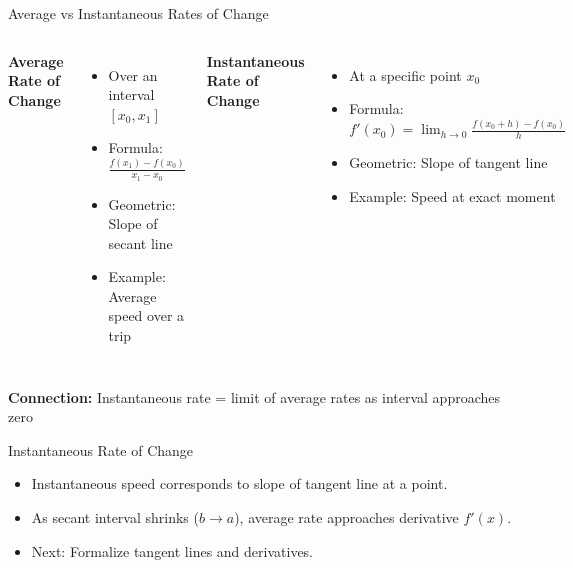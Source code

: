 \documentclass{beamer}
\begin{document}
\begin{frame}{Average vs Instantaneous Rates of Change}
  \begin{columns}
      \textbf{Average Rate of Change}
      \begin{itemize}
        \item Over an interval $[x_0, x_1]$
        \item Formula: $\frac{f(x_1) - f(x_0)}{x_1 - x_0}$
        \item Geometric: Slope of secant line
        \item Example: Average speed over a trip
      \end{itemize}
      \textbf{Instantaneous Rate of Change}
      \begin{itemize}
        \item At a specific point $x_0$
        \item Formula: $f'(x_0) = \lim_{h \to 0} \frac{f(x_0 + h) - f(x_0)}{h}$
        \item Geometric: Slope of tangent line
        \item Example: Speed at exact moment
      \end{itemize}
  \end{columns}
  \vspace{2ex}
  \begin{center}
    \textbf{Connection:} Instantaneous rate = limit of average rates as interval approaches zero
  \end{center}
\end{frame}

\begin{frame}{Instantaneous Rate of Change}
  \begin{itemize}
    \item Instantaneous speed corresponds to slope of tangent line at a point.
    \item As secant interval shrinks ($b\to a$), average rate approaches derivative $f'(x)$.
    \item Next: Formalize tangent lines and derivatives.
  \end{itemize}
\end{frame}
\end{document}
